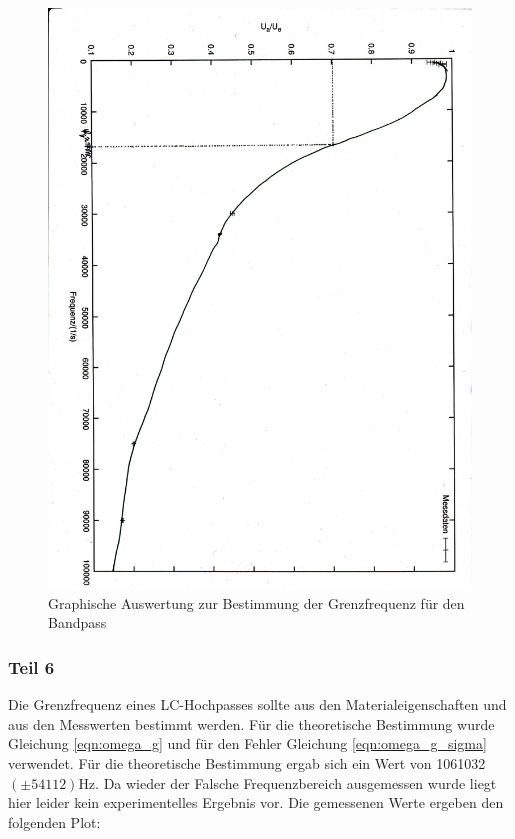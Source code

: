 \documentclass[12pt]{scrartcl}
\begin{document}
\begin{figure}[htbp] 
  \centering
    \includegraphics[scale = 0.5, angle=90]{teil_5.pdf}
  	\caption[Graphische Auswertung zur Bestimmung der Grenzfrequenz für den Bandpass]{Graphische Auswertung zur Bestimmung der Grenzfrequenz für den Bandpass}
  \label{fig:teil_5}
\end{figure}

\newpage

\subsubsection{Teil 6}
Die Grenzfrequenz eines LC-Hochpasses sollte aus den Materialeigenschaften und aus den Messwerten bestimmt werden. Für die theoretische Bestimmung wurde Gleichung \ref{eqn:omega_g} und für den Fehler Gleichung \ref{eqn:omega_g_sigma} verwendet. Für die theoretische Bestimmung ergab sich ein Wert von 1061032 $(\pm 54112)$Hz. Da wieder der Falsche Frequenzbereich ausgemessen wurde liegt hier leider kein experimentelles Ergebnis vor. Die gemessenen Werte ergeben den folgenden Plot:
\end{document}
